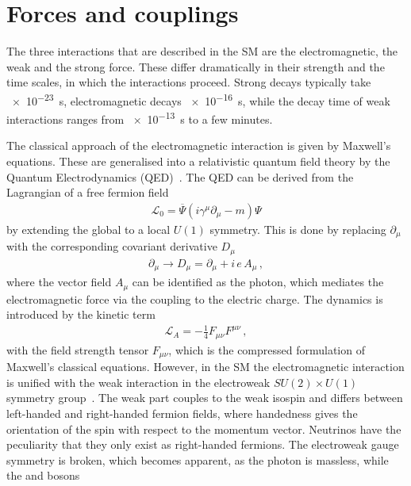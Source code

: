 
\section{Forces and couplings}
\label{sec:standardmodel:forces}

The three interactions that are described in the SM are the electromagnetic,
the weak and the strong force. These differ dramatically in their strength and
the time scales, in which the interactions proceed. Strong decays typically
take \SI{e-23}{\second}, electromagnetic decays \SI{e-16}{\second}, while the
decay time of weak interactions ranges from \SI{e-13}{\second} to a few
minutes.

The classical approach of the electromagnetic interaction is given by
Maxwell's equations. These are generalised into a relativistic quantum field
theory by the Quantum Electrodynamics
(QED)~\cite{Tomonaga01081946,Schwinger-QED1,*Schwinger-QED2,Feynman-QED1,*Feynman-QED2,*Feynman-QED3}.
The QED can be derived from the Lagrangian of a free fermion field
\begin{align}
	\mathcal{L}_0 = \overline{\Psi} (i\gamma^\mu \partial_\mu - m) \Psi
\end{align}
by extending the global to a local $U(1)$ symmetry. This is done by replacing
$\partial_\mu$ with the corresponding covariant derivative $D_\mu$
\begin{align}
	\partial_\mu \to D_\mu = \partial_\mu + i\,e\,A_\mu\,,
\end{align}
where the vector field $A_\mu$ can be identified as the photon, which mediates
the electromagnetic force via the coupling to the electric charge. The
dynamics is introduced by the kinetic term
\begin{align}
	\mathcal{L}_A = - \frac 14 F_{\mu\nu}F^{\mu\nu}\,,
\end{align}
with the field strength tensor $F_{\mu\nu}$, which is the compressed
formulation of Maxwell's classical equations. However, in the SM the
electromagnetic interaction is unified with the weak interaction in the
electroweak $SU(2)\times U(1)$ symmetry
group~\cite{Glashow:1961tr,Salam:1964ry,Weinberg:1967tq}. The weak part
couples to the weak isospin and differs between left-handed and right-handed
fermion fields, where handedness gives the orientation of the spin with
respect to the momentum vector. Neutrinos have the peculiarity that they only
exist as right-handed fermions. The electroweak gauge symmetry is broken,
which becomes apparent, as the photon is massless, while the \Wpm and \Z bosons

